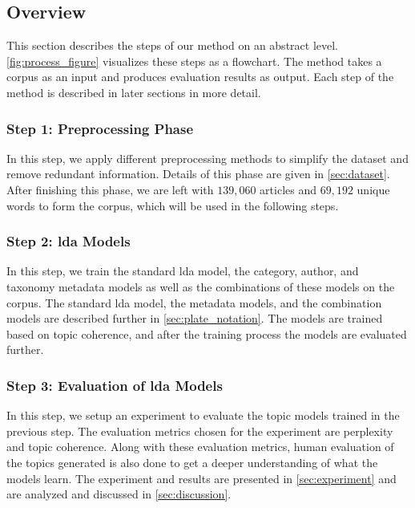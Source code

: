 \subsection{Overview}\label{sec:overview}
This section describes the steps of our method on an abstract level.
\autoref{fig:process_figure} visualizes these steps as a flowchart.
The method takes a corpus as an input and produces evaluation results as output.
Each step of the method is described in later sections in more detail.

\subsubsection*{Step 1: Preprocessing Phase}
In this step, we apply different preprocessing methods to simplify the dataset and remove redundant information.
Details of this phase are given in \autoref{sec:dataset}.
After finishing this phase, we are left with $139,060$ articles and $69,192$ unique words to form the corpus, which will be used in the following steps.

\subsubsection*{Step 2: \Gls{lda} Models}
In this step, we train the standard \gls{lda} model, the category, author, and taxonomy metadata models as well as the combinations of these models on the corpus.
The standard \gls{lda} model, the metadata models, and the combination models are described further in \autoref{sec:plate_notation}.
The models are trained based on topic coherence, and after the training process the models are evaluated further.

\subsubsection*{Step 3: Evaluation of \gls{lda} Models}
In this step, we setup an experiment to evaluate the topic models trained in the previous step.
The evaluation metrics chosen for the experiment are perplexity and topic coherence.
Along with these evaluation metrics, human evaluation of the topics generated is also done to get a deeper understanding of what the models learn.
The experiment and results are presented in \autoref{sec:experiment} and are analyzed and discussed in \autoref{sec:discussion}.



